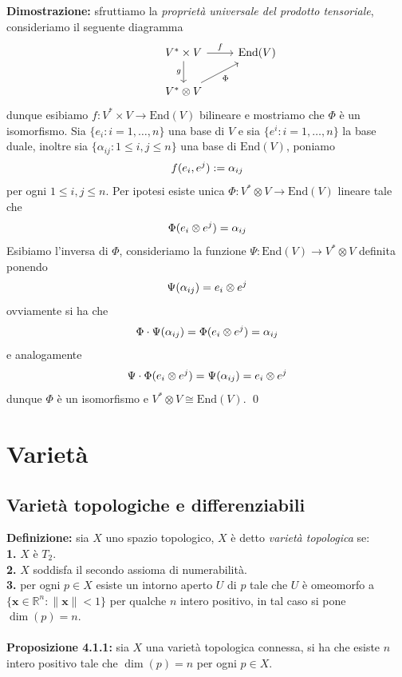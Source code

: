 \documentclass{article}
\begin{document}
\textbf{Dimostrazione:} sfruttiamo la \textit{proprietà universale del prodotto tensoriale}, consideriamo il seguente diagramma \\
\[
\begin{tikzcd}
&V^* \times V \arrow[r,"f"] \arrow[d,"g", swap] & \mathrm{End}(V) \\
&V^* \otimes V \arrow[ur, "\Phi", swap] 
\end{tikzcd}
\]
dunque esibiamo $f : V^* \times V \longrightarrow \mathrm{End}(V)$ bilineare e mostriamo che
$\Phi$ è un isomorfismo. Sia $\{ e_i : i = 1, \dots, n \}$ una base di $V$ e sia $\{ e^i : i = 1, \dots, n \}$ la base duale, inoltre sia $\{ \alpha_{ij} : 1 \leq i, j \leq n \}$ una base di $\mathrm{End}(V)$, poniamo
\begin{gather}
    f(e_i, e^j) := \alpha_{ij} \notag
\end{gather}
per ogni $1 \leq i, j \leq n$. Per ipotesi esiste unica $\Phi : V^* \otimes V \longrightarrow \mathrm{End}(V)$ lineare tale che
\begin{gather}
    \Phi(e_i \otimes e^j) = \alpha_{ij} \notag
\end{gather}
Esibiamo l'inversa di $\Phi$, consideriamo la funzione $\Psi : \mathrm{End}(V) \longrightarrow V^* \otimes V$ definita ponendo
\begin{gather}
    \Psi (\alpha_{ij}) = e_i \otimes e^j \notag
\end{gather}
ovviamente si ha che
\begin{gather}
    \Phi \cdot \Psi (\alpha_{ij}) = \Phi (e_i \otimes e^j) = \alpha_{ij} \notag
\end{gather}
e analogamente
\begin{gather}
    \Psi \cdot \Phi (e_i \otimes e^j) = \Psi(\alpha_{ij}) = e_i \otimes e^j \notag
\end{gather}
dunque $\Phi$ è un isomorfismo e $V^* \otimes V \cong \mathrm{End}(V)$. \qed

\newpage
\section{Varietà}
\subsection{Varietà topologiche e differenziabili}
\textbf{Definizione:} sia $X$ uno spazio topologico, $X$ è detto \textit{varietà topologica} se: \\
\textbf{1.} $X$ è $T_2$. \\
\textbf{2.} $X$ soddisfa il secondo assioma di numerabilità. \\
\textbf{3.} per ogni $p \in X$ esiste un intorno aperto $U$ di $p$ tale che $U$ è omeomorfo a $\{ \mathbf{x} \in \mathbb{R}^n : \| \mathbf{x} \| < 1 \}$ per qualche $n$ intero positivo, in tal caso si pone $\dim (p) = n$. \\ \\
\textbf{Proposizione 4.1.1:} sia $X$ una varietà topologica connessa, si ha che esiste $n$ intero positivo tale che $\dim (p) = n$ per ogni $p \in X$. \\
\end{document}
